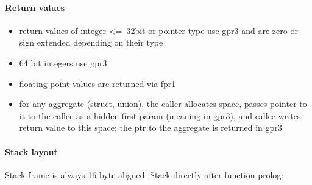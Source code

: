 \paragraph{Return values}

\begin{itemize}
\item return values of integer \textless=\ 32bit or pointer type use gpr3 and are zero or sign extended depending on their type
\item 64 bit integers use gpr3
\item floating point values are returned via fpr1
\item for any aggregate (struct, union), the caller allocates space, passes pointer to it to the callee as a hidden first param
(meaning in gpr3), and callee writes return value to this space; the ptr to the aggregate is returned in gpr3
\end{itemize}


\paragraph{Stack layout}

Stack frame is always 16-byte aligned.
Stack directly after function prolog:\\

